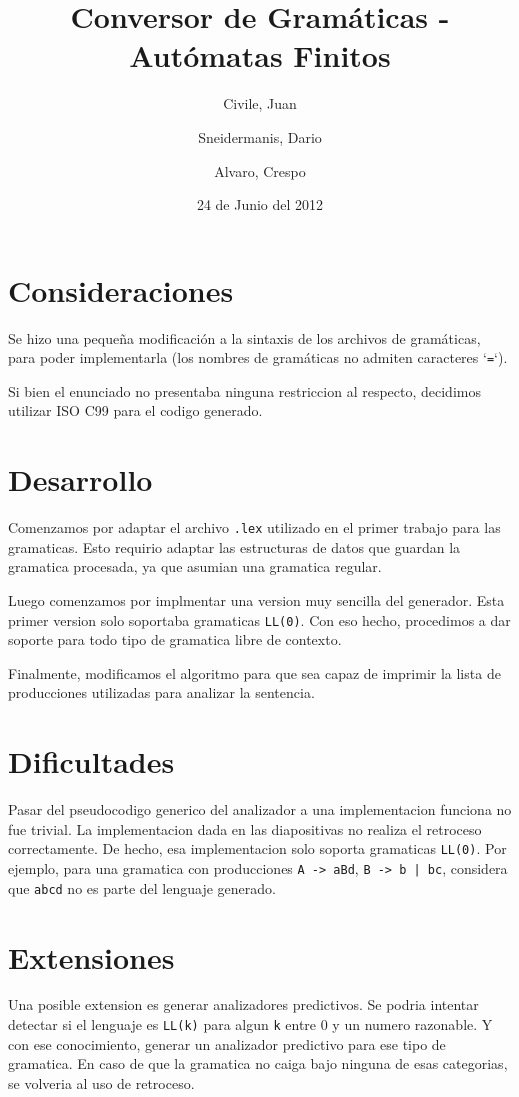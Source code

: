 \documentclass[11pt,a4paper,titlepage]{article}
\title{Conversor de Gramáticas - Autómatas Finitos}
\author{Civile, Juan \and Sneidermanis, Dario \and Alvaro, Crespo}
\date{24 de Junio del 2012}
\begin{document}
\newcommand{\awesome}[1]{\texttt{\large #1}}

\maketitle
\tableofcontents
\clearpage

\section{Consideraciones}
Se hizo una pequeña modificación a la sintaxis de los archivos de gramáticas, para poder implementarla (los nombres de gramáticas no admiten caracteres `\texttt{=}`).

Si bien el enunciado no presentaba ninguna restriccion al respecto, decidimos utilizar ISO C99 para el codigo generado.

\section{Desarrollo}
Comenzamos por adaptar el archivo \texttt{.lex} utilizado en el primer trabajo para las gramaticas.
Esto requirio adaptar las estructuras de datos que guardan la gramatica procesada, ya que asumian una gramatica regular.

Luego comenzamos por implmentar una version muy sencilla del generador.
Esta primer version solo soportaba gramaticas \texttt{LL(0)}.
Con eso hecho, procedimos a dar soporte para todo tipo de gramatica libre de contexto.

Finalmente, modificamos el algoritmo para que sea capaz de imprimir la lista de producciones utilizadas para analizar la sentencia.

\section{Dificultades}
Pasar del pseudocodigo generico del analizador a una implementacion funciona no fue trivial.
La implementacion dada en las diapositivas no realiza el retroceso correctamente.
De hecho, esa implementacion solo soporta gramaticas \texttt{LL(0)}.
Por ejemplo, para una gramatica con producciones \texttt{A -> aBd}, \texttt{B -> b | bc}, considera que \texttt{abcd} no es parte del lenguaje generado.


\section{Extensiones}
Una posible extension es generar analizadores predictivos.
Se podria intentar detectar si el lenguaje es \texttt{LL(k)} para algun \texttt{k} entre 0 y un numero razonable.
Y con ese conocimiento, generar un analizador predictivo para ese tipo de gramatica.
En caso de que la gramatica no caiga bajo ninguna de esas categorias, se volveria al uso de retroceso.
\end{document}
